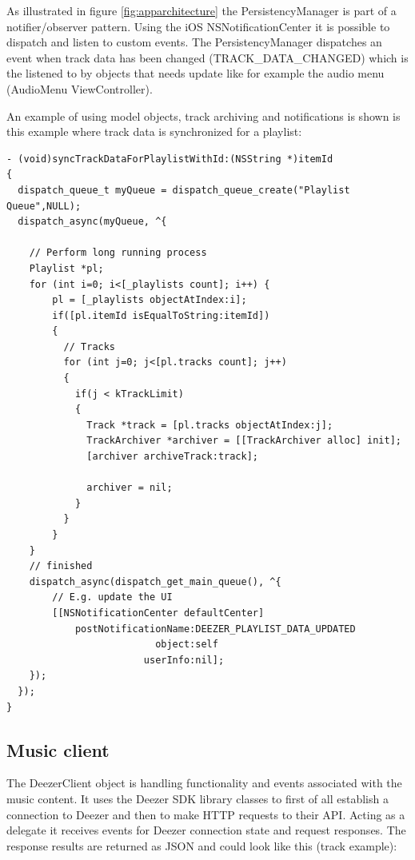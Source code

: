 As illustrated in figure \ref{fig:apparchitecture} the PersistencyManager is part of a notifier/observer pattern. Using the iOS NSNotificationCenter it is possible to dispatch and listen to custom events. The PersistencyManager dispatches an event when track data has been changed (TRACK\_DATA\_CHANGED) which is the listened to by objects that needs update like for example the audio menu (AudioMenu ViewController).

An example of using model objects, track archiving and notifications is shown is this example where track data is synchronized for a playlist:

\newpage

\begin{lstlisting}
- (void)syncTrackDataForPlaylistWithId:(NSString *)itemId
{
  dispatch_queue_t myQueue = dispatch_queue_create("Playlist Queue",NULL);
  dispatch_async(myQueue, ^{
        
    // Perform long running process
    Playlist *pl;
    for (int i=0; i<[_playlists count]; i++) {
        pl = [_playlists objectAtIndex:i];
        if([pl.itemId isEqualToString:itemId])
        {
          // Tracks
          for (int j=0; j<[pl.tracks count]; j++)
          {
            if(j < kTrackLimit)
            {
              Track *track = [pl.tracks objectAtIndex:j];
              TrackArchiver *archiver = [[TrackArchiver alloc] init];
              [archiver archiveTrack:track];
              
              archiver = nil;
            }
          }
        }
    }
    // finished
    dispatch_async(dispatch_get_main_queue(), ^{
        // E.g. update the UI
        [[NSNotificationCenter defaultCenter] 
            postNotificationName:DEEZER_PLAYLIST_DATA_UPDATED 
                          object:self 
                        userInfo:nil];
    });
  });
}
\end{lstlisting}

\subsection{Music client}
The DeezerClient object is handling functionality and events associated with the music content. It uses the Deezer SDK library classes to first of all establish a connection to Deezer and then to make HTTP requests to their API. Acting as a delegate it receives events for Deezer connection state and request responses. The response results are returned as JSON and could look like this (track example):


